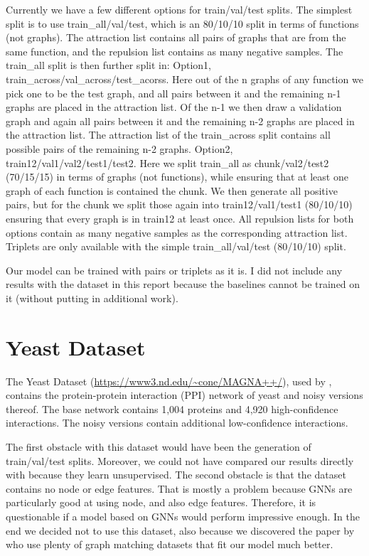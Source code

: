 Currently we have a few different options for train/val/test splits. The simplest split is to use train\_all/val/test, which is an 80/10/10 split in terms of functions (not graphs). The attraction list contains all pairs of graphs that are from the same function, and the repulsion list contains as many negative samples. The train\_all split is then further split in: Option1, train\_across/val\_across/test\_acorss. Here out of the n graphs of any function we pick one to be the test graph, and all pairs between it and the remaining n-1 graphs are placed in the attraction list. Of the n-1 we then draw a validation graph and again all pairs between it and the remaining n-2 graphs are placed in the attraction list. The attraction list of the train\_across split contains all possible pairs of the remaining n-2 graphs. Option2, train12/val1/val2/test1/test2. Here we split train\_all as chunk/val2/test2 (70/15/15) in terms of graphs (not functions), while ensuring that at least one graph of each function is contained the chunk. We then generate all positive pairs, but for the chunk we split those again into train12/val1/test1 (80/10/10) ensuring that every graph is in train12 at least once. All repulsion lists for both options contain as many negative samples as the corresponding attraction list. Triplets are only available with the simple  train\_all/val/test (80/10/10) split.

Our model can be trained with pairs or triplets as it is. I did not include any results with the dataset in this report because the baselines cannot be trained on it (without putting in additional work).

\section{Yeast Dataset}
\label{appendix:yest}

The Yeast Dataset (\url{https://www3.nd.edu/~cone/MAGNA++/}), used by \cite{yeast2019}, contains the protein-protein interaction (PPI) network of yeast and noisy versions thereof. The base network contains 1,004 proteins and 4,920 high-confidence interactions. The noisy versions contain additional low-confidence interactions.

The first obstacle with this dataset would have been the generation of train/val/test splits.  Moreover, we could not have compared our results directly with \cite{yeast2019} because they learn unsupervised. The second obstacle is that the dataset contains no node or edge features. That is mostly a problem because GNNs are particularly good at using node, and also edge features. Therefore, it is questionable if a  model based on GNNs would perform impressive enough. In the end we decided not to use this dataset, also because we discovered the paper by \cite{fey2020_update} who use plenty of graph matching datasets that fit our model much better.

